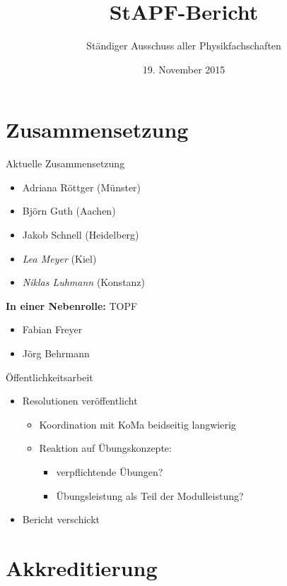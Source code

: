 \documentclass[compress,]{beamer}
\title[StAPf-Bericht]{StAPF-Bericht}
\author{Ständiger Ausschuss aller Physikfachschaften}
\institute[Zusammenkunft aller Physikfachschaften]
\date{19. November 2015}
\begin{document}
\begin{frame}[plain]{}
  \titlepage

\end{frame}

\section{Zusammensetzung}

\begin{frame}{Aktuelle Zusammensetzung}
	\begin{itemize}
		\item Adriana Röttger (Münster)
		\item Björn Guth (Aachen)
		\item Jakob Schnell (Heidelberg)
		\item \emph{Lea Meyer} (Kiel)
		\item \emph{Niklas Luhmann} (Konstanz)
	\end{itemize}
	\textbf{In einer Nebenrolle:} TOPF
	\begin{itemize}
		\item Fabian Freyer
		\item Jörg Behrmann
	\end{itemize}
\end{frame}

\begin{frame}{Öffentlichkeitsarbeit}
	\begin{itemize}
		\item Resolutionen veröffentlicht
			\begin{itemize}
				\item Koordination mit KoMa beidseitig langwierig
				\item Reaktion auf Übungskonzepte:
					\begin{itemize}
						\item verpflichtende Übungen?
						\item Übungsleistung als Teil der Modulleistung?
					\end{itemize}
			\end{itemize}
		\item Bericht verschickt
	\end{itemize}
\end{frame}

\section{Akkreditierung}
\end{document}

